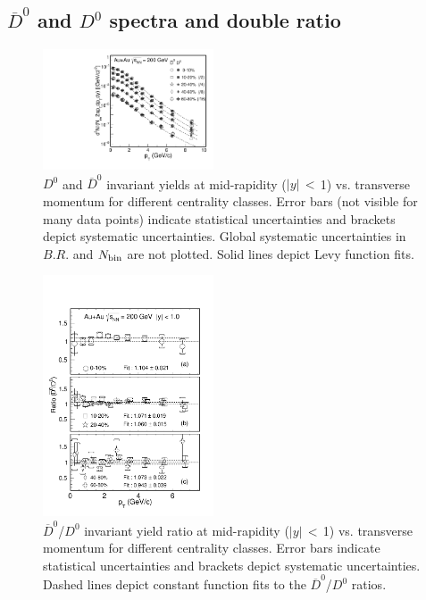 \documentclass[%
 reprint,	
showpacs,
 amsmath,amssymb,
 aps,
 prc,
]{revtex4-1}
\begin{document}
\subsection{$\overline{D}^{0}$ and $D^{0}$ spectra and double ratio}
\label{result:D0barD0ratio} 

\begin{figure}
\centering
\includegraphics[width=0.45\textwidth]{fig/D0_spectra_bothposneg.pdf}
\caption{$D^{0}$ and $\overline{D}^{0}$ invariant yields at mid-rapidity ($|y|$\,$<$\,1) vs. transverse momentum for different centrality classes. Error bars (not visible for many data points) indicate statistical uncertainties and brackets depict systematic uncertainties. Global systematic uncertainties in $B.R.$ and $N_{\rm bin}$ are not plotted. Solid lines depict Levy function fits.}
\label{fig:D0_spectra_bothposneg} 
\end{figure}

\begin{figure}
\centering
\includegraphics[width=0.45\textwidth]{fig/D0_spectra_ratioposneg_fit.pdf}
\caption{$\overline{D}^{0}$/$D^{0}$ invariant yield ratio at mid-rapidity ($|y|$\,$<$\,1) vs. transverse momentum for different centrality classes. Error bars indicate statistical uncertainties and brackets depict systematic uncertainties. Dashed lines depict constant function fits to the $\overline{D}^{0}$/$D^{0}$ ratios.}
\label{fig:D0_spectra_ratioposneg} 
\end{figure}
\end{document}
